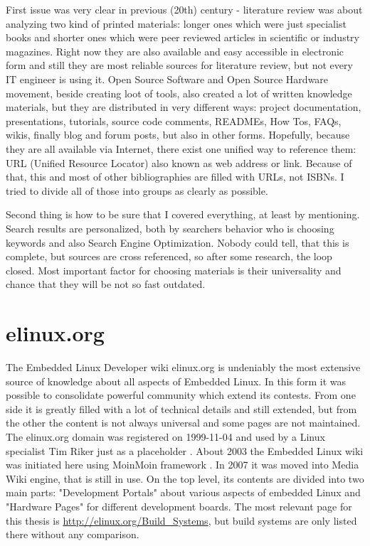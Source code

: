 \documentclass[printmode]{mgr}
\begin{document}
First issue was very clear in previous (20th) century - literature review was about analyzing two kind of printed materials: longer ones which were just specialist books and shorter ones which were peer reviewed articles in scientific or industry magazines.
Right now they are also available and easy accessible in electronic form and still they are most reliable sources for literature review, but not every IT engineer is using it.
Open Source Software and Open Source Hardware movement, beside creating loot of tools, also created a lot of written knowledge materials, but they are distributed in very different ways: project documentation, presentations, tutorials, source code comments, READMEs, How Tos, FAQs, wikis, finally blog and forum posts, but also in other forms.
Hopefully, because they are all available via Internet, there exist one unified way to reference them: URL (Unified Resource Locator) also known as web address or link. Because of that, this and most of other bibliographies are filled with URLs, not ISBNs. I tried to divide all of those into groups as clearly as possible.

Second thing is how to be sure that I covered everything, at least by mentioning. Search results are personalized, both by searchers behavior who is choosing keywords and also Search Engine Optimization. Nobody could tell, that this is complete, but sources are cross referenced, so after some research, the loop closed. Most important factor for choosing materials is their universality and chance that they will be not so fast outdated.

\section{elinux.org}

The Embedded Linux Developer wiki elinux.org is undeniably the most extensive source of knowledge about all aspects of Embedded Linux.
In this form it was possible to consolidate powerful community which extend its contests.
From one side it is greatly filled with a lot of technical details and still extended, but from the other the content is not always universal and some pages are not maintained.\\

The elinux.org domain was registered on 1999-11-04 \cite{web:whois-elinux} and used by a Linux specialist Tim Riker just as a placeholder \cite{web:riker} \cite{web:elinux-placeholder}.
About 2003 the Embedded Linux wiki was initiated here using MoinMoin framework \cite{web:elinux-moinmoin}.
In 2007 it was moved into Media Wiki engine, that is still in use.
On the top level, its contents are divided into two main parts: "Development Portals" about various aspects of embedded Linux and "Hardware Pages" for different development boards.
The most relevant page for this thesis is \url{http://elinux.org/Build_Systems}, but build systems are only listed there without any comparison.\\
\end{document}
